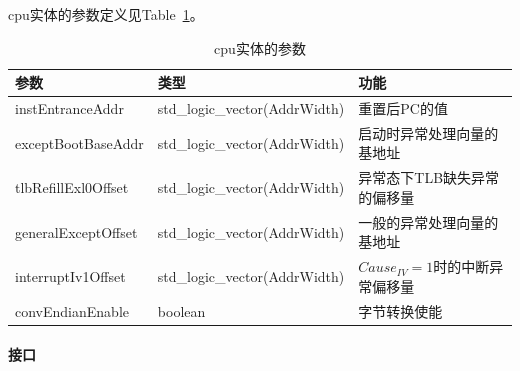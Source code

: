 \documentclass{article}
\begin{document}
\begin{spacing}{1.4}
cpu实体的参数定义见Table~\ref{tb:cpu-parameter}。
\begin{table}[!htb]
\begin{center}
\begin{tabular*}{15cm}{l|l|l}
\hline
\textbf{参数}&\textbf{类型}&\textbf{功能} \\
\hline instEntranceAddr        & std\_logic\_vector(AddrWidth)    & 重置后PC的值 \\
\hline exceptBootBaseAddr      & std\_logic\_vector(AddrWidth)    & 启动时异常处理向量的基地址 \\
\hline tlbRefillExl0Offset     & std\_logic\_vector(AddrWidth)    & 异常态下TLB缺失异常的偏移量 \\
\hline generalExceptOffset     & std\_logic\_vector(AddrWidth)    & 一般的异常处理向量的基地址 \\
\hline interruptIv1Offset      & std\_logic\_vector(AddrWidth)    & $Cause_{IV}=1$时的中断异常偏移量 \\
\hline convEndianEnable        & boolean                          & 字节转换使能 \\
\hline
\end{tabular*}
\caption{cpu实体的参数}
\label{tb:cpu-parameter}
\end{center}
\end{table}

\paragraph{接口}\mbox{}


\end{spacing}
\end{document}
